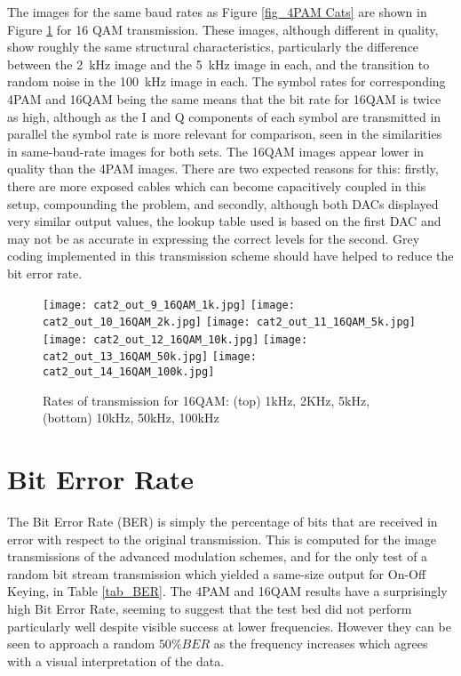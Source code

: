 \documentclass[../main.tex]{subfiles}
\begin{document}
The images for the same baud rates as Figure \ref{fig_4PAM Cats} are shown in Figure \ref{fig_16QAM Cats} for 16 QAM transmission.
These images, although different in quality, show roughly the same structural characteristics, particularly the difference between the \SI{2}{\kilo\hertz} image and the \SI{5}{\kilo\hertz} image in each, and the transition to random noise in the \SI{100}{\kilo\hertz} image in each.
The symbol rates for corresponding 4PAM and 16QAM being the same means that the bit rate for 16QAM is twice as high, although as the I and Q components of each symbol are transmitted in parallel the symbol rate is more relevant for comparison, seen in the similarities in same-baud-rate images for both sets.
The 16QAM images appear lower in quality than the 4PAM images.
There are two expected reasons for this: firstly, there are more exposed cables which can become capacitively coupled in this setup, compounding the problem, and secondly, although both DACs displayed very similar output values, the lookup table used is based on the first DAC and may not be as accurate in expressing the correct levels for the second.
Grey coding implemented in this transmission scheme should have helped to reduce the bit error rate.

\begin{figure}[ht]
	\centering
	
	\texttt{[image: cat2\_out\_9\_16QAM\_1k.jpg]}
	\texttt{[image: cat2\_out\_10\_16QAM\_2k.jpg]}
	\texttt{[image: cat2\_out\_11\_16QAM\_5k.jpg]}\\[1mm]
	\texttt{[image: cat2\_out\_12\_16QAM\_10k.jpg]}
	\texttt{[image: cat2\_out\_13\_16QAM\_50k.jpg]}
	\texttt{[image: cat2\_out\_14\_16QAM\_100k.jpg]}
	
	\caption{Rates of transmission for 16QAM: (top) 1kHz, 2KHz, 5kHz, (bottom) 10kHz, 50kHz, 100kHz}
	\label{fig_16QAM Cats}
\end{figure}


\section{Bit Error Rate}

The Bit Error Rate (BER) is simply the percentage of bits that are received in error with respect to the original transmission.
This is computed for the image transmissions of the advanced modulation schemes, and for the only test of a random bit stream transmission which yielded a same-size output for On-Off Keying, in Table \ref{tab_BER}.
The 4PAM and 16QAM results have a surprisingly high Bit Error Rate, seeming to suggest that the test bed did not perform particularly well despite visible success at lower frequencies.
However they can be seen to approach a random $50\% BER$ as the frequency increases which agrees with a visual interpretation of the data.
\end{document}
